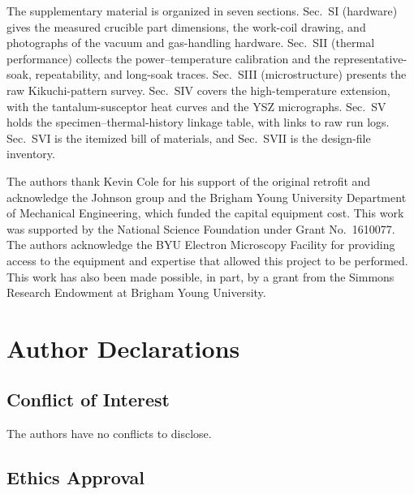 \documentclass[%
 aip,
 rsi,%
 amsmath,amssymb,
 reprint,%
]{revtex4-2}
\newif\ifdraftnotes
\newcommand{\todo}[1]{\ifdraftnotes{\color{red}\textbf{[TODO: #1]}}\fi}
\begin{document}
The supplementary material is organized in seven sections.
Sec.~SI (hardware) gives the measured crucible part dimensions, the
work-coil drawing, and photographs of the vacuum and gas-handling
hardware. Sec.~SII (thermal performance) collects the power--temperature
calibration and the representative-soak, repeatability, and long-soak
traces. Sec.~SIII (microstructure) presents the raw Kikuchi-pattern
survey. Sec.~SIV covers the high-temperature extension, with the
tantalum-susceptor heat curves and the YSZ micrographs. Sec.~SV holds the
specimen--thermal-history linkage table, with links to raw run logs.
Sec.~SVI is the itemized bill of materials, and Sec.~SVII is the
design-file inventory.

\begin{acknowledgments}
The authors thank Kevin Cole for his support of the original
retrofit and acknowledge the Johnson group and the Brigham Young University
Department of Mechanical Engineering, which funded the capital equipment
cost. This work was supported by the National Science Foundation under
Grant No.~1610077. The authors acknowledge the BYU Electron Microscopy
Facility for providing access to the equipment and expertise that allowed
this project to be performed. This work has also been made possible, in
part, by a grant from the Simmons Research Endowment at Brigham Young
University.
\end{acknowledgments}

\section*{Author Declarations}

\subsection*{Conflict of Interest}

The authors have no conflicts to disclose. \todo{confirm with all authors.}

\subsection*{Ethics Approval}
\end{document}
